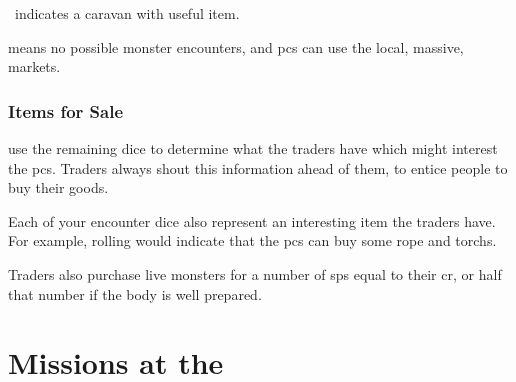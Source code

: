 \begin{multicols}{2}
\begin{dlist}
  \item
  \encCivilization\ indicates a caravan with  useful item.

  \item
  \encCivilization means no possible monster encounters, and \glspl{pc} can use the local, massive, markets.
\end{dlist}

\subsubsection{Items for Sale}
\label{traders}
use the remaining dice to determine what the traders have which might interest the \glspl{pc}.
Traders always shout this information ahead of them, to entice people to buy their goods.

\encTraders

Each of your encounter dice also represent an interesting item the traders have.
For example, rolling  would indicate that the \glspl{pc} can buy some rope and \glspl{torch}.

Traders also purchase live \glspl{monster} for a number of \glspl{sp} equal to their \gls{cr}, or half that number if the body is well prepared.


\end{multicols}

\setCycle{\month}{\day}

\section{Missions at the }
\label{NGmissions}

